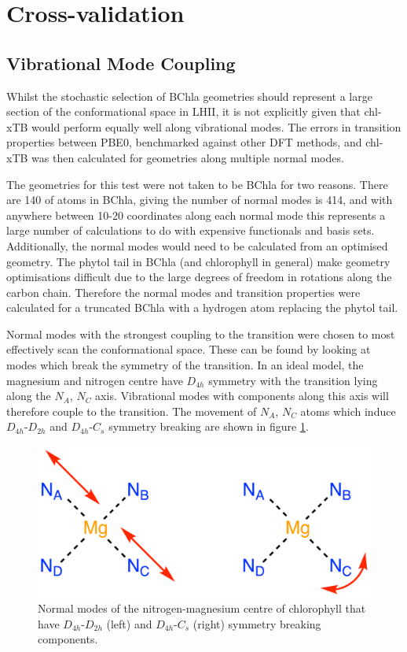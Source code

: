 \afterpartskip
\section{Cross-validation}
\label{sec:chl_benchmarking}

\afterpartskip
\subsection{Vibrational Mode Coupling}
\label{subsec:pot_energy_surfaces}

Whilst the stochastic selection of BChla geometries should represent a large section 
of the conformational space in LHII, it is not explicitly given that chl-xTB would
perform equally well along vibrational modes. The errors in transition properties
between PBE0, benchmarked against other DFT methods, and chl-xTB was then calculated 
for geometries along multiple normal modes.

The geometries for this test were not taken to be BChla for two reasons. There are
140 of atoms in BChla, giving the number of normal modes is 414, and with
anywhere between 10-20 coordinates along each normal mode this represents a large
number of calculations to do with expensive functionals and basis sets. Additionally,
the normal modes would need to be calculated from an optimised geometry. The phytol
tail in BChla (and chlorophyll in general) make geometry optimisations difficult
due to the large degrees of freedom in rotations along the carbon chain. Therefore
the normal modes and transition properties were calculated for a truncated BChla
with a hydrogen atom replacing the phytol tail.

Normal modes with the strongest coupling to the \Qy transition were chosen to most
effectively scan the conformational space. These can be found by looking at modes
which break the symmetry of the \Qy transition. In an ideal model, the magnesium
and nitrogen centre have $D_{4h}$ symmetry with the \Qy transition lying along 
the $N_A$, $N_C$ axis. Vibrational modes with components along this axis will
therefore couple to the transition. The movement of $N_A$, $N_C$ atoms which induce
$D_{4h}$-$D_{2h}$ and $D_{4h}$-$C_{s}$ symmetry breaking are shown in figure \ref{fig:D4_sym_breaking}.

\begin{figure}[h]
    \centering
    \includegraphics[scale=1.5]{chapters/chapter03/D4h_symmetry.png}
    \caption{Normal modes of the nitrogen-magnesium centre of chlorophyll that have
    $D_{4h}$-$D_{2h}$ (left) and $D_{4h}$-$C_{s}$ (right) symmetry breaking components.}
    \label{fig:D4_sym_breaking}
\end{figure}

